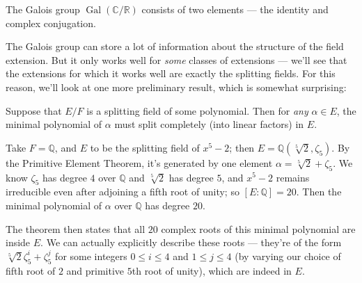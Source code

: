 \begin{example}
    The Galois group $\operatorname{Gal}(\mathbb{C}/\mathbb{R})$ consists of two elements --- the identity and complex conjugation. 
\end{example}

The Galois group can store a lot of information about the structure of the field extension. But it only works well for \emph{some} classes of extensions --- we'll see that the extensions for which it works well are exactly the splitting fields. For this reason, we'll look at one more preliminary result, which is somewhat surprising: 

\begin{theorem} \label{all minimal polyn split}
    Suppose that $E/F$ is a splitting field of some polynomial. Then for \emph{any} $\alpha \in E$, the minimal polynomial of $\alpha$ must split completely (into linear factors) in $E$. 
\end{theorem}

\begin{example}
    Take $F = \mathbb{Q}$, and $E$ to be the splitting field of $x^5 - 2$; then $E = \mathbb{Q}(\sqrt[5]{2}, \zeta_5)$. By the Primitive Element Theorem, it's generated by one element $\alpha = \sqrt[5]{2} + \zeta_5$. We know $\zeta_5$ has degree $4$ over $\mathbb{Q}$ and $\sqrt[5]{2}$ has degree $5$, and $x^5 - 2$ remains irreducible even after adjoining a fifth root of unity; so $[E : \mathbb{Q}] = 20$. Then the minimal polynomial of $\alpha$ over $\mathbb{Q}$ has degree $20$. 
    
    The theorem then states that all $20$ complex roots of this minimal polynomial are inside $E$. We can actually explicitly describe these roots --- they're of the form $\sqrt[5]{2}\zeta_5^i + \zeta_5^j$ for some integers $0 \leq i \leq 4$ and $1 \leq j \leq 4$ (by varying our choice of fifth root of $2$ and primitive $5$th root of unity), which are indeed in $E$. 
\end{example}

